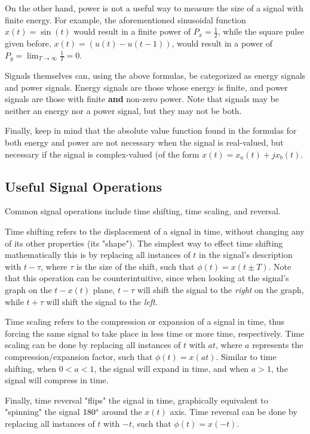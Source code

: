 \documentclass{article}
\begin{document}
On the other hand, power is not a useful way to measure the size of a signal with finite energy. For example, the aforementioned sinusoidal function \(x(t) = \sin{(t)}\) would result in a finite power of \(P_x = \frac{1}{2}\), while the square pulse given before, \(x(t) = (u(t) - u(t-1))\), would result in a power of \(P_g = \lim_{T \to \infty}\frac{1}{T} = 0\).

Signals themselves can, using the above formulas, be categorized as energy signals and power signals. Energy signals are those whose energy is finite, and power signals are those with finite \textbf{and} non-zero power. Note that signals may be neither an energy nor a power signal, but they may not be both.

Finally, keep in mind that the absolute value function found in the formulas for both energy and power are not necessary when the signal is real-valued, but necessary if the signal is complex-valued (of the form \(x(t) = x_a(t) + jx_b(t)\).

\subsection{Useful Signal Operations}
Common signal operations include time shifting, time scaling, and reversal. 

Time shifting refers to the displacement of a signal in time, without changing any of its other properties (its "shape"). The simplest way to effect time shifting mathematically this is by replacing all instances of \(t\) in the signal's description with \(t-\tau\), where \(\tau\) is the size of the shift, such that \(\phi(t) = x(t\pm T)\). Note that this operation can be counterintuitive, since when looking at the signal's graph on the \(t-x(t)\) plane, \(t-\tau\) will shift the signal to the \textit{right} on the graph, while \(t+\tau\) will shift the signal to the \textit{left}. 

Time scaling refers to the compression or expansion of a signal in time, thus forcing the same signal to take place in less time or more time, respectively. Time scaling can be done by replacing all instances of \(t\) with \(at\), where \(a\) represents the compression/expansion factor, such that \(\phi(t) = x(at)\). Similar to time shifting, when \(0 < a < 1\), the signal will expand in time, and when \(a > 1\), the signal will compress in time.

Finally, time reversal "flips" the signal in time, graphically equivalent to "spinning" the signal \(180\degree\) around the \(x(t)\) axis. Time reversal can be done by replacing all instances of \(t\) with \(-t\), such that \(\phi(t) = x(-t)\).
\end{document}
